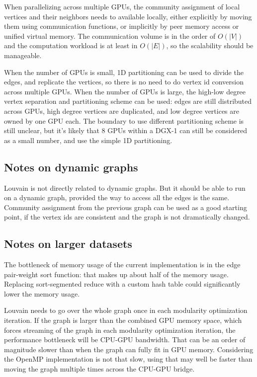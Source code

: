 \documentclass[10pt,oneside]{memoir}
\begin{document}
When parallelizing across multiple GPUs, the community assignment of
local vertices and their neighbors needs to available locally, either
explicitly by moving them using communication functions, or implicitly
by peer memory access or unified virtual memory. The communication
volume is in the order of \(O(|V|)\) and the computation workload is at
least in \(O(|E|)\), so the scalability should be manageable.

When the number of GPUs is small, 1D partitioning can be used to divide
the edges, and replicate the vertices, so there is no need to do vertex
id conversion across multiple GPUs. When the number of GPUs is large,
the high-low degree vertex separation and partitioning scheme can be
used: edges are still distributed across GPUs, high degree vertices are
duplicated, and low degree vertices are owned by one GPU each. The
boundary to use different partitioning scheme is still unclear, but it's
likely that 8 GPUs within a DGX-1 can still be considered as a small
number, and use the simple 1D partitioning.

\hypertarget{notes-on-dynamic-graphs-4}{%
\subsection{Notes on dynamic graphs}\label{notes-on-dynamic-graphs-4}}

Louvain is not directly related to dynamic graphs. But it should be able
to run on a dynamic graph, provided the way to access all the edges is
the same. Community assignment from the previous graph can be used as a
good starting point, if the vertex ids are consistent and the graph is
not dramatically changed.

\hypertarget{notes-on-larger-datasets-4}{%
\subsection{Notes on larger datasets}\label{notes-on-larger-datasets-4}}

The bottleneck of memory usage of the current implementation is in the
edge pair-weight sort function: that makes up about half of the memory
usage. Replacing sort-segmented reduce with a custom hash table could
significantly lower the memory usage.

Louvain needs to go over the whole graph once in each modularity
optimization iteration. If the graph is larger than the combined GPU
memory space, which forces streaming of the graph in each modularity
optimization iteration, the performance bottleneck will be CPU-GPU
bandwidth. That can be an order of magnitude slower than when the graph
can fully fit in GPU memory. Considering the OpenMP implementation is
not that slow, using that may well be faster than moving the graph
multiple times across the CPU-GPU bridge.
\end{document}
